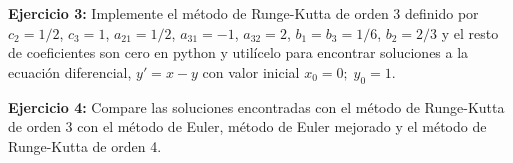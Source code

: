 \documentclass[10.5pt]{article}
\begin{document}
{\bf Ejercicio 3:} Implemente el método de Runge-Kutta de orden 3 definido por $c_{2}=1/2$, $c_{3}=1$, $a_{21}=1/2$, $a_{31}=-1$, $a_{32}=2$, $b_{1}=b_{3}=1/6$, $b_{2}=2/3$ y el resto de coeficientes son cero en python y utilícelo para encontrar soluciones a la ecuación diferencial, $y'=x-y$ con valor inicial $x_{0}=0;\; y_{0}=1$.

{\bf Ejercicio 4:} Compare las soluciones encontradas con el método de Runge-Kutta de orden 3 con el método de Euler, método de Euler mejorado y el método de Runge-Kutta de orden 4.


%
\end{document}
